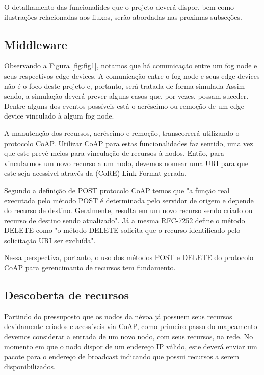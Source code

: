 O detalhamento das funcionalides que o projeto deverá dispor, bem como ilustrações relacionadas aos fluxos, serão abordadas nas proximas subseções.



\subsection{Middleware}

Observando a Figura \ref{fig:fig1}, notamos que há comunicação entre um fog node e seus respectivos edge devices.
A comunicação entre o fog node e seus edge devices não é o foco deste projeto e, portanto, será tratada de forma simulada
Assim sendo, a simulação deverá prever alguns casos que, por vezes, possam suceder. Dentre alguns dos eventos possíveis está 
o acréscimo ou remoção de um edge device vinculado à algum fog node.

A manutenção dos recursos, acréscimo e remoção, transcorrerá utilizando o protocolo CoAP.
Utilizar CoAP para estas funcionalidades faz sentido, uma vez que este prevê meios para vinculação de recursos à nodos.
Então, para vincularmos um novo recurso a um nodo, devemos nomear uma URI para que este seja acessivel através da (CoRE) Link Format gerada.

Segundo a definição de POST protocolo CoAP temos que "a função real executada pelo método POST é determinada pelo servidor de origem e depende do recurso de destino.
Geralmente, resulta em um novo recurso sendo criado ou recurso de destino sendo atualizado"\cite{rfc7252}.
Já a mesma RFC-7252 define o método DELETE como "o método DELETE solicita que o recurso identificado pelo solicitação URI ser excluída"\cite{rfc7252}.

Nessa perspectiva, portanto, o uso dos métodos POST e DELETE do protocolo CoAP para gerencimanto de recursos tem fundamento.

\subsection{Descoberta de recursos}

Partindo do pressuposto que os nodos da névoa já possuem seus recursos devidamente criados e acessíveis via CoAP,
como primeiro passo do mapeamento devemos considerar a entrada de um novo nodo, com seus recursos, na rede.
No momento em que o nodo dispor de um endereço IP válido, este deverá enviar um pacote para o endereço de broadcast indicando que possui recursos a serem disponibilizados.

